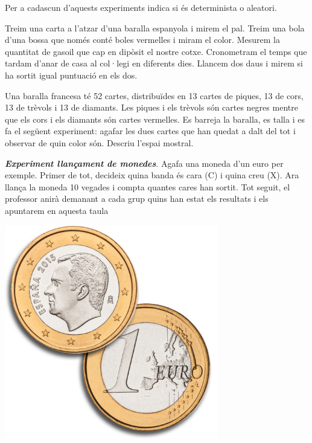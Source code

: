\begin{mylist}
\exer \mental Per a cadascun d'aquests experiments indica si és determinista o aleatori.
\begin{tasks} 
	\task  Treim una carta a l'atzar d'una baralla espanyola i mirem el pal.
	\task  Treim una bola d'una bossa que només conté boles vermelles i miram el color.
	\task  Mesurem la quantitat de gasoil que cap en dipòsit el nostre cotxe.
	\task  Cronometram el temps que tardam d'anar de casa al col·legi en diferents dies.
	\task  Llancem dos daus i mirem si ha sortit igual puntuació en els dos.
\end{tasks}

\exer  Una baralla francesa té 52 cartes, distribuïdes en 13 cartes de piques, 13 de cors, 13 de trèvols i 13 de diamants. Les piques i els trèvols són cartes negres mentre que els cors i els diamants són cartes vermelles. Es barreja la baralla, es talla i es fa el següent experiment: agafar les dues cartes que han quedat a dalt del tot i observar de quin color són. Descriu l'espai mostral. 
  
\vspace{-2cm}
\exer \simbolsearch \begin{minipage}[t]{0.7\textwidth} \textit{\bf Experiment llançament de monedes}. Agafa una moneda d'un euro per exemple. Primer de tot, decideix quina banda és cara (C) i quina creu (X). Ara llança la moneda 10 vegades i compta quantes cares han sortit.  Tot seguit, el professor anirà demanant a cada grup quins han estat els resultats i els apuntarem en aquesta taula
	\end{minipage}
\begin{minipage}{0.3\textwidth}
	\vspace{2cm}
	\centering
	\includegraphics[width=0.7\textwidth]{img-04/monedes}
\end{minipage}
	


\end{mylist}
